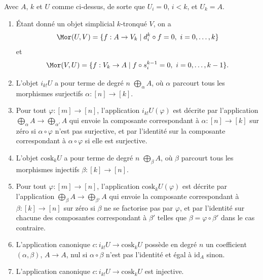 \begin{lemma}
\label{lemma-eilenberg-maclane-object}
Avec $A$, $k$ et $U$ comme ci-dessus, de sorte que $U_i = 0$, $i < k$,
et $U_k = A$.
\begin{enumerate}
\item Étant donné un objet simplicial $k$-tronqué $V$, on a
$$
\Mor(U, V)
=
\{ f : A \to V_k \mid d^k_i \circ f = 0, \ i = 0, \ldots, k \}
$$
et
$$
\Mor(V, U)
=
\{ f : V_k \to A \mid f \circ s^{k - 1}_i = 0, \ i = 0, \ldots, k - 1 \}.
$$
\item L'objet $i_{k!} U$ a pour terme de degré $n$
$\bigoplus_\alpha A$, où $\alpha$ parcourt tous les morphismes surjectifs
$\alpha : [n] \to [k]$.
\item Pour tout $\varphi : [m] \to [n]$, l'application
$i_{k!} U(\varphi)$ est décrite par l'application
$\bigoplus_\alpha A \to \bigoplus_{\alpha'} A$
qui envoie la composante correspondant à $\alpha : [n] \to [k]$ sur
zéro si $\alpha \circ \varphi$ n'est pas surjective, et par l'identité
sur la composante correspondant à $\alpha \circ \varphi$ si elle est
surjective.
\item L'objet $\text{cosk}_k U$ a pour terme de degré $n$
$\bigoplus_\beta A$, où $\beta$ parcourt tous les morphismes injectifs
$\beta : [k] \to [n]$.
\item Pour tout $\varphi : [m] \to [n]$, l'application
$\text{cosk}_k U(\varphi)$ est décrite par l'application
$\bigoplus_\beta A \to \bigoplus_{\beta'} A$
qui envoie la composante correspondant à $\beta : [k] \to [n]$ sur zéro
si $\beta$ ne se factorise pas par $\varphi$, et par l'identité sur
chacune des composantes correspondant à $\beta'$ telles que
$\beta = \varphi \circ \beta'$ dans le cas contraire.
\item L'application canonique
$
c : i_{k !} U \to \text{cosk}_k U
$
possède en degré $n$ un coefficient $(\alpha, \beta)$, $A \to A$, nul
si $\alpha \circ \beta$ n'est pas l'identité et égal à $\text{id}_A$
sinon.
\item L'application canonique
$
c : i_{k !} U \to \text{cosk}_k U
$
est injective.
\end{enumerate}
\end{lemma}

